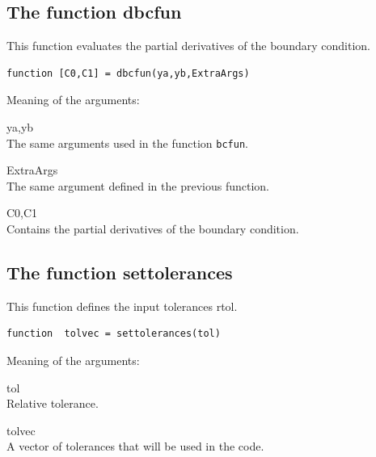 \documentclass[<options>]{article}
\begin{document}
\subsection{The function dbcfun}\label{dbcfun}
This function evaluates the partial derivatives of the boundary condition.
\begin{verbatim}
function [C0,C1] = dbcfun(ya,yb,ExtraArgs)
\end{verbatim}
Meaning of the arguments:
\begin{list}
{}{%
  \renewcommand\makelabel[1]{\texttt{#1}\hfill}
}
\item[ya,yb]\ \\
The same arguments used in the function \texttt{bcfun}.
\item[ExtraArgs]\ \\
The same argument defined in the previous function.
\item[C0,C1]\ \\
Contains the partial derivatives of the boundary condition.
\end{list}
\subsection{The function settolerances}\label{settol}
This function defines the input tolerances rtol.
\begin{verbatim}
function  tolvec = settolerances(tol)
\end{verbatim}
Meaning of the arguments:
\begin{list}
{}{%
  \renewcommand\makelabel[1]{\texttt{#1}\hfill}
}
\item[tol]\ \\
Relative tolerance.
\item[tolvec]\ \\
A  vector of  tolerances that will be used in the code.
\end{list}
\end{document}
